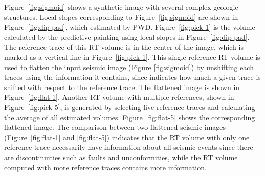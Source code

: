     Figure~\ref{fig:sigmoid} shows a synthetic image with several complex 
    geologic structures. 
    Local slopes corresponding to Figure~\ref{fig:sigmoid} are shown in 
    Figure~\ref{fig:dip-pad}, which  estimated by PWD. 
    Figure~\ref{fig:pick-1} is the  volume calculated 
    by the predictive painting using local slopes in Figure~\ref{fig:dip-pad}. 
    The reference trace of this RT volume is in the center of the image, which 
    is marked as a vertical line in Figure~\ref{fig:pick-1}. 
    This single reference RT volume is used to flatten the input seismic 
    image (Figure \ref{fig:sigmoid}) by unshifting each traces using the 
    information it contains, since  indicates how 
    much a given trace is shifted with respect to the reference trace.
    The flattened image is shown in Figure~\ref{fig:flat-1}.
    Another RT volume with multiple references, shown in 
    Figure~\ref{fig:pick-5}, is generated by selecting five reference traces and 
    calculating the average of all estimated  
    volumes.
    Figure~\ref{fig:flat-5} shows the corresponding flattened image.
    The comparison between two flattened seismic images (Figure~\ref{fig:flat-1} 
    and \ref{fig:flat-5}) indicates that the RT volume with only one reference 
    trace  necessarily have information about all seismic events since 
    there are discontinuities such as faults and unconformities, while the RT 
    volume computed with more reference traces contains more information.


